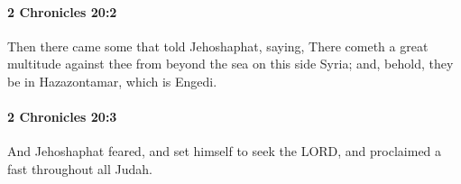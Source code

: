 		\paragraph{2 Chronicles 20:2} %
			\label{2CHRONICLES-20-2}

			Then there came some that told Jehoshaphat, saying, There cometh a great multitude against thee from beyond the sea on this side Syria; and, behold, they be in Hazazontamar, which is Engedi.


		\paragraph{2 Chronicles 20:3} %
			\label{2CHRONICLES-20-3}

			And Jehoshaphat feared, and set himself to seek the LORD, and proclaimed a fast throughout all Judah.


